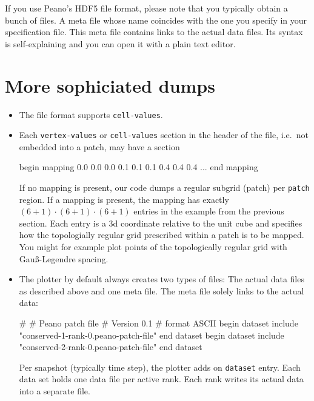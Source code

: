 \noindent
If you use Peano's HDF5 file format, please note that you typically obtain
a bunch of files. 
A meta file whose name coincides with the one you specify in your specification
file. 
This meta file contains links to the actual data files. 
Its syntax is self-explaining and you can open it with a plain text editor.


\section{More sophiciated dumps}

\begin{itemize}
  \item The file format supports \texttt{cell-values}.
  \item Each \texttt{vertex-values} or \texttt{cell-values} section in the
  header of the file, i.e.~not embedded into a patch, may have a section
  \begin{code}
   begin mapping
     0.0 0.0 0.0
     0.1 0.1 0.1
     0.4 0.4 0.4
     ...
   end mapping
  \end{code} 
  If no mapping is present, our code dumps a regular subgrid (patch) per
  \texttt{patch} region. If a mapping is present, the mapping has exactly $(6+1)
  \cdot (6+1) \cdot (6+1)$ entries in the example from the previous section.
  Each entry is a 3d coordinate relative to the unit cube and specifies how the
  topologially regular grid prescribed within a patch is to be mapped. You might
  for example plot points of the topologically regular grid with 
  Gau\ss -Legendre spacing.
  \item The plotter by default always creates two types of files: The actual
  data files as described above and one meta file. The meta file solely links to
  the actual data:
  \begin{code}
# 
# Peano patch file 
# Version 0.1 
# 
format ASCII
begin dataset
  include "conserved-1-rank-0.peano-patch-file"
end dataset
begin dataset
  include "conserved-2-rank-0.peano-patch-file"
end dataset
  \end{code}
  Per snapshot (typically time step), the plotter adds on \texttt{dataset}
  entry. Each data set holds one data file per active rank. Each rank writes its
  actual data into a separate file. 
\end{itemize}


